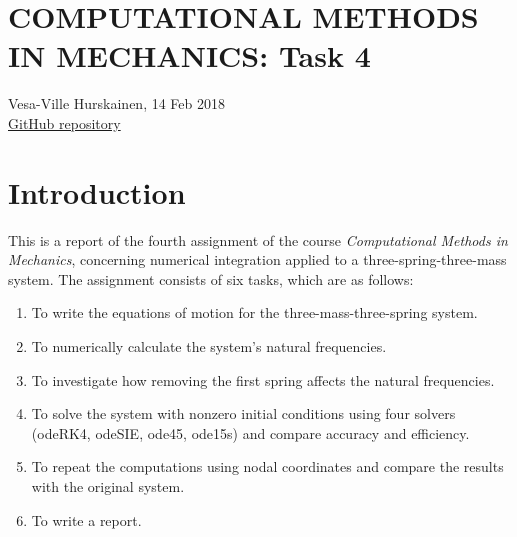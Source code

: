\documentclass{article}
\begin{document}
	\section*{COMPUTATIONAL METHODS IN MECHANICS: Task 4}
	Vesa-Ville Hurskainen, 14 Feb 2018\\
	\href{https://github.com/VesaVilleHurskainen/cmim2018}{GitHub repository}

	\section*{Introduction}
	This is a report of the fourth assignment of the course \textit{Computational Methods in Mechanics}, concerning numerical integration applied to a three-spring-three-mass system. The assignment consists of six tasks, which are as follows:
	
	\begin{enumerate}
		\setlength\itemsep{0pt}
		\item To write the equations of motion for the three-mass-three-spring system.
		\item To numerically calculate the system's natural frequencies.
		\item To investigate how removing the first spring affects the natural frequencies.
		\item To solve the system with nonzero initial conditions using four solvers (odeRK4, odeSIE, ode45, ode15s) and compare accuracy and
		efficiency.
		\item To repeat the computations using nodal coordinates and compare the results with the original system.
		\item To write a report.
	\end{enumerate}
\end{document}
